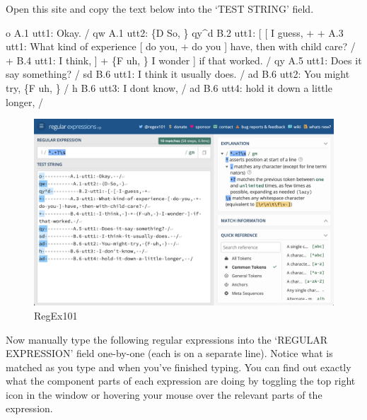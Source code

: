 \documentclass[
  letterpaper,
]{latex/krantz}
\newenvironment{Shaded}{\begin{snugshade}}{\end{snugshade}}
\newcommand{\NormalTok}[1]{\textcolor[rgb]{0.00,0.00,0.00}{#1}}
\begin{document}
Open this site and copy the text below into the `TEST STRING' field.

\begin{Shaded}
\begin{Highlighting}[]
\NormalTok{o          A.1 utt1: Okay.  /}
\NormalTok{qw          A.1 utt2: \{D So, \}}
\NormalTok{qy\^{}d          B.2 utt1: [ [ I guess, +}
\NormalTok{+          A.3 utt1: What kind of experience [ do you, + do you ] have, then with child care? /}
\NormalTok{+          B.4 utt1: I think, ] + \{F uh, \} I wonder ] if that worked. /}
\NormalTok{qy          A.5 utt1: Does it say something? /}
\NormalTok{sd          B.6 utt1: I think it usually does.  /}
\NormalTok{ad          B.6 utt2: You might try, \{F uh, \}  /}
\NormalTok{h          B.6 utt3: I don\textquotesingle{}t know,  /}
\NormalTok{ad          B.6 utt4: hold it down a little longer,  /}
\end{Highlighting}
\end{Shaded}

\begin{figure}[h]

{\centering \includegraphics[width=6.39in,height=\textheight]{figures/curate-datasets/cd-regex-101.png}

}

\caption{\label{fig-cd-regex-101-image}RegEx101}

\end{figure}

Now manually type the following regular expressions into the `REGULAR
EXPRESSION' field one-by-one (each is on a separate line). Notice what
is matched as you type and when you've finished typing. You can find out
exactly what the component parts of each expression are doing by
toggling the top right icon in the window or hovering your mouse over
the relevant parts of the expression.
\end{document}
